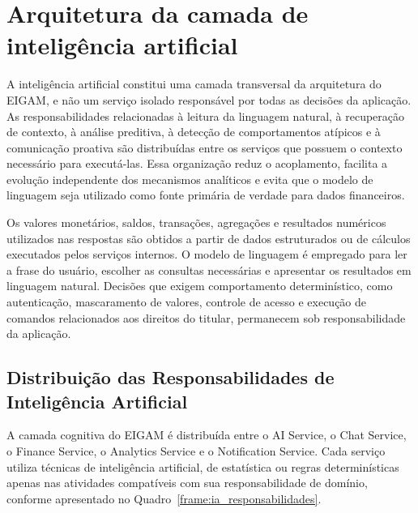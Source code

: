 \section{Arquitetura da camada de inteligência artificial}

A inteligência artificial constitui uma camada transversal da arquitetura do EIGAM, e não um serviço isolado responsável por todas as decisões da aplicação. As responsabilidades relacionadas à leitura da linguagem natural, à recuperação de contexto, à análise preditiva, à detecção de comportamentos atípicos e à comunicação proativa são distribuídas entre os serviços que possuem o contexto necessário para executá-las. Essa organização reduz o acoplamento, facilita a evolução independente dos mecanismos analíticos e evita que o modelo de linguagem seja utilizado como fonte primária de verdade para dados financeiros.

Os valores monetários, saldos, transações, agregações e resultados numéricos utilizados nas respostas são obtidos a partir de dados estruturados ou de cálculos executados pelos serviços internos. O modelo de linguagem é empregado para ler a frase do usuário, escolher as consultas necessárias e apresentar os resultados em linguagem natural. Decisões que exigem comportamento determinístico, como autenticação, mascaramento de valores, controle de acesso e execução de comandos relacionados aos direitos do titular, permanecem sob responsabilidade da aplicação.

\subsection{Distribuição das Responsabilidades de Inteligência Artificial}

A camada cognitiva do EIGAM é distribuída entre o AI Service, o Chat Service, o Finance Service, o Analytics Service e o Notification Service. Cada serviço utiliza técnicas de inteligência artificial, de estatística ou regras determinísticas apenas nas atividades compatíveis com sua responsabilidade de domínio, conforme apresentado no Quadro~\ref{frame:ia_responsabilidades}.

